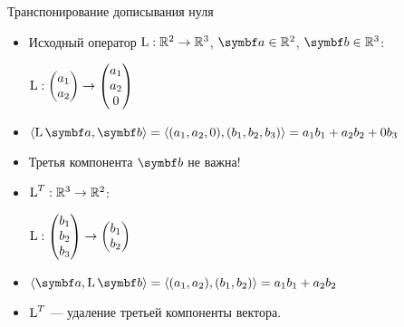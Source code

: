 \begin{frame}{Транспонирование дописывания нуля}


\begin{itemize}[<+->]
\item Исходный оператор $\operatorname{L}: \mathbb{R}^2 \to \mathbb{R}^3$, $\ba \in \R^2$, $\bb\in \R^3$:

$\operatorname{L}: \begin{pmatrix}
    a_1 \\
    a_2 \\
\end{pmatrix} \to \begin{pmatrix}
    a_1 \\
    a_2 \\
    0 \\
\end{pmatrix}$

\item $\langle \LL \ba , \bb \rangle = \langle (a_1, a_2, 0) , (b_1, b_2, b_3) \rangle =  a_1 b_1 + a_2 b_2 + 0 b_3$


\item Третья компонента $\bb$ не важна!


\item $\operatorname{L}^T  : \mathbb{R}^3 \to \mathbb{R}^2$:

$\operatorname{L}: \begin{pmatrix}
    b_1 \\
    b_2 \\
    b_3
\end{pmatrix} \to \begin{pmatrix}
    b_1 \\
    b_2 \\
\end{pmatrix}$


\item $\langle \ba , \LL \bb \rangle = \langle (a_1, a_2) , (b_1, b_2) \rangle =  a_1 b_1 + a_2 b_2$

\item $\operatorname{L}^T$ — удаление третьей компоненты вектора.

\end{itemize}

\end{frame}
    

